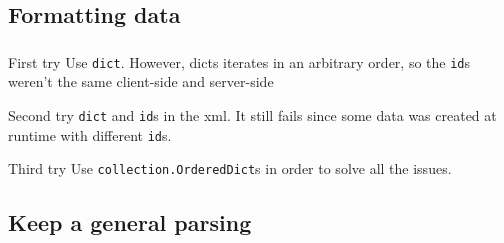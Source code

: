 \documentclass[a4paper, 11pt]{beamer}
\begin{document}
\subsection{Formatting data}

\begin{frame}[fragile]
    \frametitle{\subsecname}
    \begin{alertblock}{First try}
        Use \texttt{dict}. However, dicts iterates in an arbitrary order,
        so the \verb|id|s weren't the same client-side and server-side
    \end{alertblock}

    \pause

    \begin{alertblock}{Second try}
        \texttt{dict} and \verb|id|s in the xml. It still fails
        since some data was created at runtime with different \verb|id|s.
    \end{alertblock}

    \pause

    \begin{block}{Third try}
        Use \texttt{collection.OrderedDict}s in order to solve
        all the issues.
    \end{block}
\end{frame}

\subsection{Keep a general parsing}

\begin{frame}
\end{frame}
\end{document}
